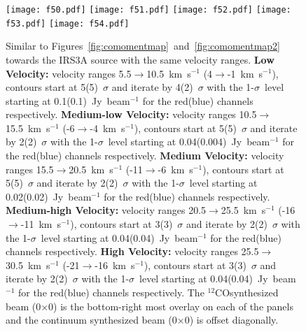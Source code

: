 \documentclass[twocolumn, 12pt]{aastex63}
\newcommand{\co}{$^{12}$CO}
\newcommand{\cobeam}{0\farcs19$\times$0\farcs11}
\newcommand{\contbeam}{0\farcs11$\times$0\farcs05}
\begin{document}
\begin{figure}[H]
   \begin{center}

\texttt{[image: f50.pdf]}
\texttt{[image: f51.pdf]}
\texttt{[image: f52.pdf]}
\texttt{[image: f53.pdf]}
\texttt{[image: f54.pdf]}
   \caption{Similar to Figures~\ref{fig:comomentmap}~and~\ref{fig:comomentmap2} towards the IRS3A source with the same velocity ranges. \textbf{Low Velocity:} velocity ranges 5.5$\rightarrow$10.5~km~s$^{-1}$ (4$\rightarrow$-1~km~s$^{-1}$), contours start at 5(5)~$\sigma$ and iterate by 4(2)~$\sigma$ with the 1-$\sigma$~level starting at 0.1(0.1)~Jy~beam$^{-1}$ for the red(blue) channels respectively. \textbf{Medium-low Velocity:} velocity ranges 10.5$\rightarrow$15.5~km~s$^{-1}$ (-6$\rightarrow$-4~km~s$^{-1}$), contours start at 5(5)~$\sigma$ and iterate by 2(2)~$\sigma$ with the 1-$\sigma$~level starting at 0.04(0.004)~Jy~beam$^{-1}$ for the red(blue) channels respectively. \textbf{Medium Velocity:} velocity ranges 15.5$\rightarrow$20.5~km~s$^{-1}$ (-11$\rightarrow$-6~km~s$^{-1}$), contours start at 5(5)~$\sigma$ and iterate by 2(2)~$\sigma$ with the 1-$\sigma$~level starting at 0.02(0.02)~Jy~beam$^{-1}$ for the red(blue) channels respectively. \textbf{Medium-high Velocity:} velocity ranges 20.5$\rightarrow$25.5~km~s$^{-1}$ (-16$\rightarrow$-11~km~s$^{-1}$), contours start at 3(3)~$\sigma$ and iterate by 2(2)~$\sigma$ with the 1-$\sigma$~level starting at 0.04(0.04)~Jy~beam$^{-1}$ for the red(blue) channels respectively. \textbf{High Velocity:} velocity ranges 25.5$\rightarrow$30.5~km~s$^{-1}$ (-21$\rightarrow$-16~km~s$^{-1}$), contours start at 3(3)~$\sigma$ and iterate by 2(2)~$\sigma$ with the 1-$\sigma$~level starting at 0.04(0.04)~Jy~beam$^{-1}$ for the red(blue) channels respectively. The \co\space synthesized beam (\cobeam) is the bottom-right most overlay on each of the panels and the continuum synthesized beam (\contbeam) is offset diagonally.}\label{fig:comomentmapirs3a}
\end{center}
\end{figure}
\end{document}
